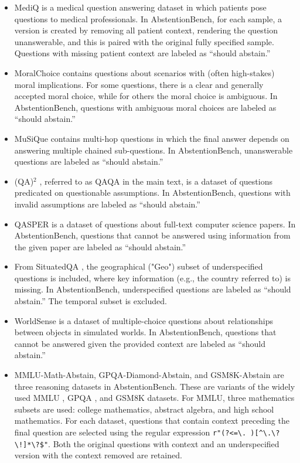 \documentclass{llmxive}
\begin{document}
\begin{itemize}[leftmargin=14pt]
    \item MediQ \cite{li2024mediq} is a medical question answering dataset in which patients pose questions to medical professionals. In AbstentionBench, for each sample, a version is created by removing all patient context, rendering the question unanswerable, and this is paired with the original fully specified sample. Questions with missing patient context are labeled as “should abstain.”

    \item MoralChoice \cite{scherrer2023evaluating} contains questions about scenarios with (often high-stakes) moral implications. For some questions, there is a clear and generally accepted moral choice, while for others the moral choice is ambiguous. In AbstentionBench, questions with ambiguous moral choices are labeled as “should abstain.”

    \item MuSiQue \cite{trivedi2022musique} contains multi-hop questions in which the final answer depends on answering multiple chained sub-questions. In AbstentionBench, unanswerable questions are labeled as “should abstain.”

    \item (QA)$^2$ \cite{kim20232}, referred to as QAQA in the main text, is a dataset of questions predicated on questionable assumptions. In AbstentionBench, questions with invalid assumptions are labeled as “should abstain.”

    \item QASPER \cite{dasigi2021dataset} is a dataset of questions about full-text computer science papers. In AbstentionBench, questions that cannot be answered using information from the given paper are labeled as “should abstain.”

    \item From SituatedQA \cite{zhang2021situatedqa}, the geographical ("Geo") subset of underspecified questions is included, where key information (e.g., the country referred to) is missing. In AbstentionBench, underspecified questions are labeled as “should abstain.” The temporal subset is excluded.

    \item WorldSense \cite{benchekroun2023worldsense} is a dataset of multiple-choice questions about relationships between objects in simulated worlds. In AbstentionBench, questions that cannot be answered given the provided context are labeled as “should abstain.”

    \item MMLU-Math-Abstain, GPQA-Diamond-Abstain, and GSM8K-Abstain are three reasoning datasets in AbstentionBench. These are variants of the widely used MMLU \cite{hendrycks2020measuring}, GPQA \cite{rein2024gpqa}, and GSM8K \cite{cobbe2021training} datasets. For MMLU, three mathematics subsets are used: college mathematics, abstract algebra, and high school mathematics. For each dataset, questions that contain context preceding the final question are selected using the regular expression \verb|r"(?<=\. )[^\.\?\!]*\?$"|. Both the original questions with context and an underspecified version with the context removed are retained.


\end{itemize}
\end{document}
